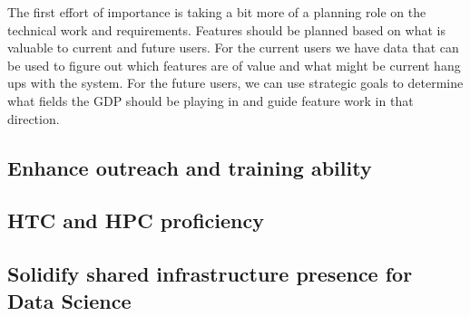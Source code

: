 \documentclass{article}
\begin{document}
The first effort of importance is taking a bit more of a planning role on the technical work and requirements.
Features should be planned based on what is valuable to current and future users.
For the current users we have data that can be used to figure out which features are of value and what might be current hang ups with the  system.
For the future users, we can use strategic goals to determine what fields the GDP should be playing in and guide feature work in that direction.


\subsection{Enhance outreach and training ability}

\subsection{HTC and HPC proficiency}

\subsection{Solidify shared infrastructure presence for Data Science}
\end{document}
